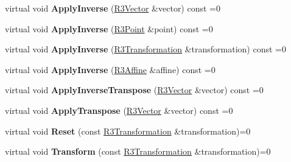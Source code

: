 \begin{DoxyCompactItemize}
\item 
virtual void {\bfseries Apply\+Inverse} (\hyperlink{class_r3_vector}{R3\+Vector} \&vector) const  =0\hypertarget{class_r3_transformation_a0cc945f3871e62539e463ef01e62b2b3}{}\label{class_r3_transformation_a0cc945f3871e62539e463ef01e62b2b3}

\item 
virtual void {\bfseries Apply\+Inverse} (\hyperlink{class_r3_point}{R3\+Point} \&point) const  =0\hypertarget{class_r3_transformation_ae26c82f934acdee40328516e0cb16c93}{}\label{class_r3_transformation_ae26c82f934acdee40328516e0cb16c93}

\item 
virtual void {\bfseries Apply\+Inverse} (\hyperlink{class_r3_transformation}{R3\+Transformation} \&transformation) const  =0\hypertarget{class_r3_transformation_abaa5d37d45834188dd9d0de204db02f3}{}\label{class_r3_transformation_abaa5d37d45834188dd9d0de204db02f3}

\item 
virtual void {\bfseries Apply\+Inverse} (\hyperlink{class_r3_affine}{R3\+Affine} \&affine) const  =0\hypertarget{class_r3_transformation_a80f3a0b0766f00a2b1988338a2757437}{}\label{class_r3_transformation_a80f3a0b0766f00a2b1988338a2757437}

\item 
virtual void {\bfseries Apply\+Inverse\+Transpose} (\hyperlink{class_r3_vector}{R3\+Vector} \&vector) const  =0\hypertarget{class_r3_transformation_a3ba6f0db517b367f932e256695faf019}{}\label{class_r3_transformation_a3ba6f0db517b367f932e256695faf019}

\item 
virtual void {\bfseries Apply\+Transpose} (\hyperlink{class_r3_vector}{R3\+Vector} \&vector) const  =0\hypertarget{class_r3_transformation_aefbcc2e7065cb996096a0a530159124f}{}\label{class_r3_transformation_aefbcc2e7065cb996096a0a530159124f}

\item 
virtual void {\bfseries Reset} (const \hyperlink{class_r3_transformation}{R3\+Transformation} \&transformation)=0\hypertarget{class_r3_transformation_a0fbb6253fad9ebef1a2a2a8665c6aea1}{}\label{class_r3_transformation_a0fbb6253fad9ebef1a2a2a8665c6aea1}

\item 
virtual void {\bfseries Transform} (const \hyperlink{class_r3_transformation}{R3\+Transformation} \&transformation)=0\hypertarget{class_r3_transformation_a1da4e6e350f20020e84f326097823b85}{}\label{class_r3_transformation_a1da4e6e350f20020e84f326097823b85}


\end{DoxyCompactItemize}
